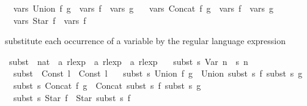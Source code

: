 \begin{isabellebody}
\ \ {\isachardoublequoteopen}vars\ {\isacharparenleft}{\kern0pt}Union\ f\ g{\isacharparenright}{\kern0pt}\ {\isacharequal}{\kern0pt}\ vars\ f\ {\isasymunion}\ vars\ g{\isachardoublequoteclose}\ {\isacharbar}{\kern0pt}\isanewline
\ \ {\isachardoublequoteopen}vars\ {\isacharparenleft}{\kern0pt}Concat\ f\ g{\isacharparenright}{\kern0pt}\ {\isacharequal}{\kern0pt}\ vars\ f\ {\isasymunion}\ vars\ g{\isachardoublequoteclose}\ {\isacharbar}{\kern0pt}\isanewline
\ \ {\isachardoublequoteopen}vars\ {\isacharparenleft}{\kern0pt}Star\ f{\isacharparenright}{\kern0pt}\ {\isacharequal}{\kern0pt}\ vars\ f{\isachardoublequoteclose}%
\begin{isamarkuptext}%
substitute each occurrence of a variable  by the regular language expression %
\end{isamarkuptext}\isamarkuptrue%
\isamarkupfalse%
\ subst\ {\isacharcolon}{\kern0pt}{\isacharcolon}{\kern0pt}\ {\isachardoublequoteopen}{\isacharparenleft}{\kern0pt}nat\ {\isasymRightarrow}\ {\isacharprime}{\kern0pt}a\ rlexp{\isacharparenright}{\kern0pt}\ {\isasymRightarrow}\ {\isacharprime}{\kern0pt}a\ rlexp\ {\isasymRightarrow}\ {\isacharprime}{\kern0pt}a\ rlexp{\isachardoublequoteclose}\ \isanewline
\ \ {\isachardoublequoteopen}subst\ s\ {\isacharparenleft}{\kern0pt}Var\ n{\isacharparenright}{\kern0pt}\ {\isacharequal}{\kern0pt}\ s\ n{\isachardoublequoteclose}\ {\isacharbar}{\kern0pt}\isanewline
\ \ {\isachardoublequoteopen}subst\ {\isacharunderscore}{\kern0pt}\ {\isacharparenleft}{\kern0pt}Const\ l{\isacharparenright}{\kern0pt}\ {\isacharequal}{\kern0pt}\ Const\ l{\isachardoublequoteclose}\ {\isacharbar}{\kern0pt}\isanewline
\ \ {\isachardoublequoteopen}subst\ s\ {\isacharparenleft}{\kern0pt}Union\ f\ g{\isacharparenright}{\kern0pt}\ {\isacharequal}{\kern0pt}\ Union\ {\isacharparenleft}{\kern0pt}subst\ s\ f{\isacharparenright}{\kern0pt}\ {\isacharparenleft}{\kern0pt}subst\ s\ g{\isacharparenright}{\kern0pt}{\isachardoublequoteclose}\ {\isacharbar}{\kern0pt}\isanewline
\ \ {\isachardoublequoteopen}subst\ s\ {\isacharparenleft}{\kern0pt}Concat\ f\ g{\isacharparenright}{\kern0pt}\ {\isacharequal}{\kern0pt}\ Concat\ {\isacharparenleft}{\kern0pt}subst\ s\ f{\isacharparenright}{\kern0pt}\ {\isacharparenleft}{\kern0pt}subst\ s\ g{\isacharparenright}{\kern0pt}{\isachardoublequoteclose}\ {\isacharbar}{\kern0pt}\isanewline
\ \ {\isachardoublequoteopen}subst\ s\ {\isacharparenleft}{\kern0pt}Star\ f{\isacharparenright}{\kern0pt}\ {\isacharequal}{\kern0pt}\ Star\ {\isacharparenleft}{\kern0pt}subst\ s\ f{\isacharparenright}{\kern0pt}{\isachardoublequoteclose}%

\end{isabellebody}
